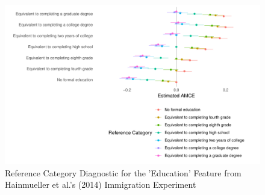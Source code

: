 \documentclass[a4paper,12pt]{article}\usepackage[]{graphicx}\usepackage[]{color}
\makeatletter
\def\maxwidth{ %
  \ifdim\Gin@nat@width>\linewidth
    \linewidth
  \else
    \Gin@nat@width
  \fi
}
\newenvironment{knitrout}{}{} %
\makeatother
\begin{document}
\begin{knitrout}
\color{fgcolor}\begin{figure}
\includegraphics[width=\maxwidth]{figure/reference_category-1} \caption[Reference Category Diagnostic for the 'Education' Feature from Hainmueller et al.'s (2014) Immigration Experiment]{Reference Category Diagnostic for the 'Education' Feature from Hainmueller et al.'s (2014) Immigration Experiment}\label{fig:reference_category}
\end{figure}


\end{knitrout}
\end{document}
